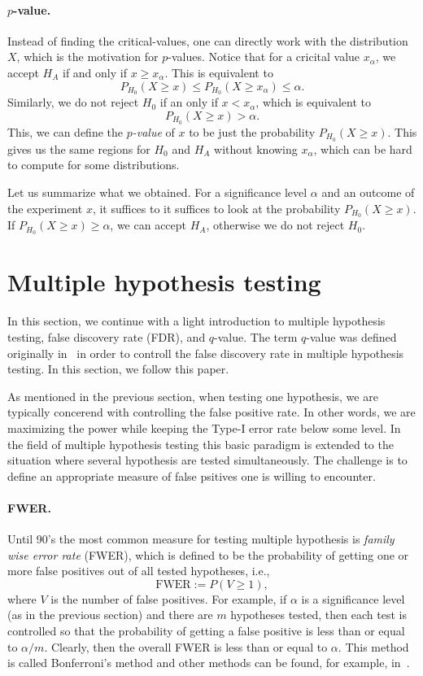 \paragraph{$p$-value.}
Instead of finding the critical-values, one can directly work with the distribution $X$, which is the motivation for $p$-values.
Notice that for a cricital value $x_\alpha$, we accept $H_A$ if and only if $x\geq x_\alpha$.
This is equivalent to
$$P_{H_0}(X\geq x) \leq P_{H_0}(X\geq x_\alpha)\leq\alpha.$$
Similarly, we do not reject $H_0$ if an only if $x < x_\alpha$, which is equivalent to
$$P_{H_0}(X\geq x) > \alpha.$$
This, we can define the \emph{$p$-value} of $x$ to be just the probability $P_{H_0}(X\geq x)$.
This gives us the same regions for $H_0$ and $H_A$ without knowing $x_\alpha$, which can be hard to compute for some distributions.

Let us summarize what we obtained.
For a significance level $\alpha$ and an outcome of the experiment $x$, it suffices to it suffices to look at the probability $P_{H_0}(X\geq x)$.
If $P_{H_0}(X\geq x) \geq \alpha$, we can accept $H_A$, otherwise we do not reject $H_0$.



\section{Multiple hypothesis testing}
\label{qvalue}

In this section, we continue with a light introduction to multiple hypothesis testing, false discovery rate (FDR), and $q$-value.
The term $q$-value was defined originally in~\cite{storey2003positive} in order to controll the false discovery rate in multiple hypothesis testing.
In this section, we follow this paper.

As mentioned in the previous section, when testing one hypothesis, we are typically concerend with controlling the false positive rate.
In other words, we are maximizing the power while keeping the Type-I error rate below some level.
In the field of multiple hypothesis testing this basic paradigm is extended to the situation where several hypothesis are tested simultaneously.
The challenge is to define an appropriate measure of false psitives one is willing to encounter.

\paragraph{FWER.}
Until 90's the most common measure for testing multiple hypothesis is \emph{family wise error rate} (FWER), which is defined to be the probability of getting one or more false positives out of all tested hypotheses, i.e., $$\text{FWER} := P(V \geq 1),$$ where $V$ is the number of false positives.
For example, if $\alpha$ is a significance level (as in the previous section) and there are $m$ hypotheses tested, then each test is controlled so that the probability of getting a false positive is less than or equal to $\alpha/m$.
Clearly, then the overall FWER is less than or equal to $\alpha$.
This method is called Bonferroni's method and other methods can be found, for example, in~\cite{shaffer1994multiple}.

